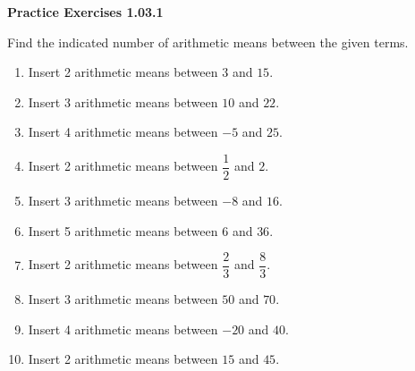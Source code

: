 \vspace{0.3ex}
\noindent\textbf{Practice Exercises 1.03.1}

\vspace{0.2ex}

Find the indicated number of arithmetic means between the given terms.
\begin{enumerate}
    \item Insert 2 arithmetic means between $3$ and $15$.
    \item Insert 3 arithmetic means between $10$ and $22$.
    \item Insert 4 arithmetic means between $-5$ and $25$.
    \item Insert 2 arithmetic means between $\dfrac{1}{2}$ and $2$.
    \item Insert 3 arithmetic means between $-8$ and $16$.
    \item Insert 5 arithmetic means between $6$ and $36$.
    \item Insert 2 arithmetic means between $\dfrac{2}{3}$ and $\dfrac{8}{3}$.
    \item Insert 3 arithmetic means between $50$ and $70$.
    \item Insert 4 arithmetic means between $-20$ and $40$.
    \item Insert 2 arithmetic means between $15$ and $45$.
\end{enumerate}